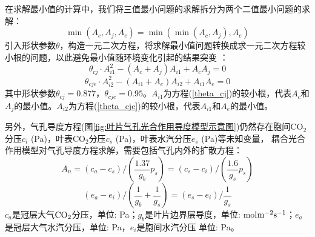 在求解最小值的计算中，我们将三值最小问题的求解拆分为两个二值最小问题的求解：
\begin{equation}\label{min_Ac_Aj_Ae}
\min \left(A_{c}, A_{j}, A_{e}\right)=\min \left(\min \left(A_{c}, A_{j}\right), A_{e}\right)
\end{equation}
引入形状参数$\theta$，构造一元二次方程，将求解最小值问题转换成求一元二次方程较小根的问题，以此避免最小值随环境变化引起的结果突变 \citep{collatz1991,collatz1992}：
\begin{equation}\label{theta_cj}
\theta_{c j} \cdot A_{i1}^{2}-\left(A_{c}+A_{j}\right) A_{i1}+A_{c} A_{j}=0
\end{equation}
\begin{equation}\label{theta_cje}
\theta_{c j e} \cdot A_{i2}^{2}-\left(A_{i1}+A_{e}\right) A_{i2}+A_{i1} A_{e}=0
\end{equation}
其中形状参数$\theta_{cj}=0.877$，$\theta_{cje}=0.95$。$A_{i1}$为方程(\ref{theta_cj})的较小根，代表$A_c$和$A_j$的最小值。$A_{i2}$为方程(\ref{theta_cje})的较小根，代表$A_{i1}$和$A_e$的最小值。


另外，气孔导度方程(图\ref{fig:叶片气孔光合作用导度模型示意图})仍然存在胞间CO$_2$分压$c_i$ (Pa)，叶表CO$_2$分压$c_s$ (Pa)，叶表水汽分压$e_s$ (Pa)等未知变量，
耦合光合作用模型对气孔导度方程求解，需要包括气孔内外的扩散方程：
\begin{equation}\label{A_n2}
A_{n}=\left(c_{a}-c_{s}\right) /\left(\frac{1.37}{g_{b}} p_{s}\right)=\left(c_{s}-c_{i}\right) /\left(\frac{1.6}{g_{s}} p_{s}\right)
\end{equation}
\begin{equation}\label{ea_ei}
\left(e_{a}-e_{i}\right) /\left(\frac{1}{g_{b}}+\frac{1}{g_{s}}\right)=\left(e_{s}-e_{i}\right) / \frac{1}{g_{s}}
\end{equation}
$c_a$是冠层大气$\rm CO_2$分压，单位: Pa；$g_b$是叶片边界层导度，单位: mol$\rm m^{-2}s^{-1}$；$e_a$是冠层大气水汽分压，单位: Pa，$e_i$是胞间水汽分压 单位: Pa。

